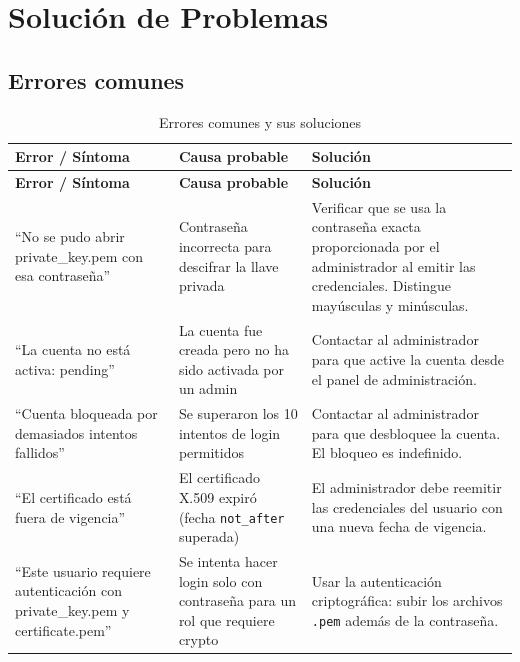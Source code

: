 \documentclass[10pt,letterpaper]{report}
\begin{document}
\chapter{Solución de Problemas}

\section{Errores comunes}

\begin{longtable}{p{4.2cm} p{4cm} p{5.8cm}}
  \caption{Errores comunes y sus soluciones} \label{tab:errores} \\
  \toprule
  \textbf{Error / Síntoma} & \textbf{Causa probable} & \textbf{Solución} \\
  \midrule
  \endfirsthead
  \toprule
  \textbf{Error / Síntoma} & \textbf{Causa probable} & \textbf{Solución} \\
  \midrule
  \endhead
  \bottomrule
  \endfoot

  ``No se pudo abrir private\_key.pem con esa contraseña'' &
  Contraseña incorrecta para descifrar la llave privada &
  Verificar que se usa la contraseña exacta proporcionada por el administrador al emitir las credenciales. Distingue mayúsculas y minúsculas. \\
  \midrule

  ``La cuenta no está activa: pending'' &
  La cuenta fue creada pero no ha sido activada por un admin &
  Contactar al administrador para que active la cuenta desde el panel de administración. \\
  \midrule

  ``Cuenta bloqueada por demasiados intentos fallidos'' &
  Se superaron los 10 intentos de login permitidos &
  Contactar al administrador para que desbloquee la cuenta. El bloqueo es indefinido. \\
  \midrule

  ``El certificado está fuera de vigencia'' &
  El certificado X.509 expiró (fecha \texttt{not\_after} superada) &
  El administrador debe reemitir las credenciales del usuario con una nueva fecha de vigencia. \\
  \midrule

  ``Este usuario requiere autenticación con private\_key.pem y certificate.pem'' &
  Se intenta hacer login solo con contraseña para un rol que requiere crypto &
  Usar la autenticación criptográfica: subir los archivos \texttt{.pem} además de la contraseña. \\
  \midrule


\end{longtable}
\end{document}
